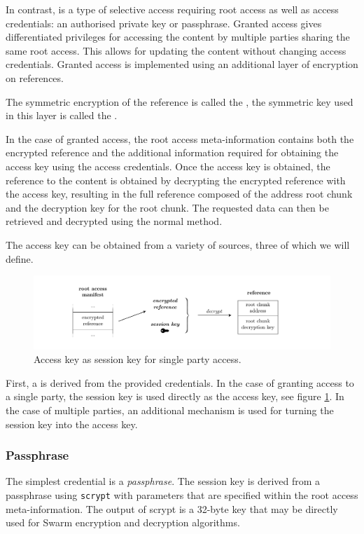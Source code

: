 In contrast,  is a type of selective access requiring root access as well as access credentials: an authorised private key or passphrase. Granted access gives differentiated privileges for accessing the content by multiple parties sharing the same root access. This allows for updating the content without changing access credentials. Granted access is implemented using an additional layer of encryption on references.

The symmetric encryption of the reference is called the , the symmetric key used in this layer is called the .

In the case of granted access, the root access meta-information contains both the encrypted reference and the additional information required for obtaining the access key using the access credentials. Once the access key is obtained, the reference to the content is obtained by decrypting the encrypted reference with the access key, resulting in the full reference composed of the address root chunk and the decryption key for the root chunk. The requested data can then be retrieved and decrypted using the normal method.

The access key can be obtained from a variety of sources, three of which we will define.

\begin{figure}[htbp]
\centering
\includegraphics[width=\textwidth]{fig/access-control-single-party.pdf}
\caption[Access key as session key for single party access  \statusyellow]{Access key as session key for single party access.}
\label{fig:access-control-single-party}
\end{figure}

First, a  is derived from the provided credentials. In the case of granting access to a single party, the session key is used directly as the access key, see figure \ref{fig:access-control-single-party}. In the case of multiple parties, an additional mechanism is used for turning the session key into the access key.

\subsubsection{Passphrase}
The simplest credential is a \emph{passphrase}. The session key is derived from a passphrase using \lstinline{scrypt} with parameters that are specified within the root access meta-information. The output of scrypt is a 32-byte key that may be directly used for Swarm encryption and decryption algorithms.

